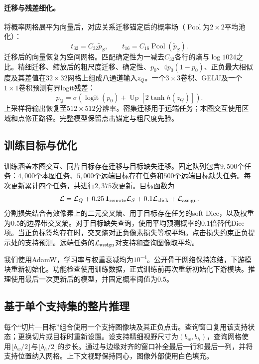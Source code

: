 \paragraph{迁移与残差细化。}
将概率网格展平为向量后，对应关系迁移锚定后的概率场（$\operatorname{Pool}$为$2\times2$平均池化）：
\begin{equation}
 t_{32}=C_{32}\widetilde p_S,\qquad
 t_{16}=C_{16}\operatorname{Pool}(\widetilde p_S).
\end{equation}
迁移后的向量恢复为空间网格。匹配确定性为一减去$C_{32}$各行的熵与$\log 1024$之比。精细迁移、缩放后的粗尺度迁移、确定性、$p_0$、$4p_0(1-p_0)$、正负最大相似度及其差值在$32\times32$网格上组成八通道输入$z_Q$。一个$3\times3$卷积、GELU及一个$1\times1$卷积预测有界logit残差：
\begin{equation}
 p_Q=\sigma\!\left(\operatorname{logit}(p_0)
                +\operatorname{Up}[2\tanh h(z_Q)]\right).
\label{eq:residual}
\end{equation}
上采样将输出恢复至$512\times512$分辨率。密集迁移用于远端任务；本图交互使用区域和点修正路径。完整模型保留点击锚定与粗尺度先验。

\subsection{训练目标与优化}
\label{sec:training}
训练涵盖本图交互、同片目标存在迁移与目标缺失迁移。固定队列包含$9{,}500$个任务：$4{,}000$个本图任务、$5{,}000$个远端目标存在任务和$500$个远端目标缺失任务。每次更新累计四个任务，共进行$2{,}375$次更新。目标函数为
\begin{equation}
 \mathcal L=\mathcal L_Q+0.25\,\mathbf{1}_{\rm remote}\mathcal L_S
                  +0.1\mathcal L_{\rm click}+\mathcal L_{\rm assign}.
\end{equation}
分割损失结合有效像素上的二元交叉熵、用于目标存在任务的soft Dice，以及权重为$0.5$的边界带交叉熵。对于目标缺失查询，使用平均预测概率的$0.1$倍替代Dice项。当正负标签均存在时，交叉熵对正负像素损失等权平均。点击损失约束正负提示处的支持预测。远端任务的$\mathcal L_{\rm assign}$对支持和查询图像取平均。

我们使用AdamW，学习率与权重衰减均为$10^{-4}$。公开骨干网络保持冻结，下游模块重新初始化。功能检查使用训练数据，正式训练前再次重新初始化下游模块。推理使用最后一次更新后的模型，并固定概率阈值为$0.5$。

\subsection{基于单个支持集的整片推理}
\label{sec:wsi}
每个“切片—目标”组合使用一个支持图像块及其正负点击。查询窗口复用该支持状态；更换切片或目标时重新设置。设支持精细视野尺寸为$(b_w,b_h)$，查询网格使用$\lfloor b_w/2\rfloor$与$\lfloor b_h/2\rfloor$的步长。通过与边缘对齐的窗口补全最后一行和最后一列，并将支持位置纳入网格。上下文视野保持同心，图像外部使用白色填充。

